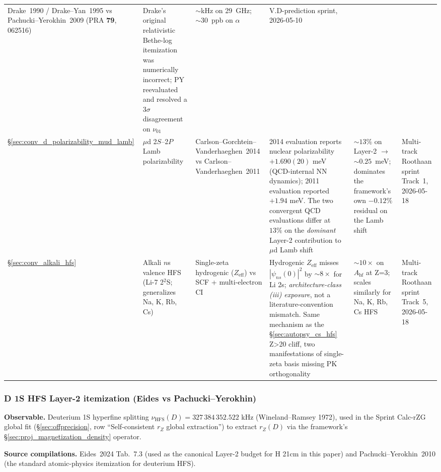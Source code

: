 \documentclass[11pt]{article}
\begin{document}
\begin{table}[h]
\begin{tabular}{p{0.6cm} p{2.6cm} p{3.0cm} p{2.6cm} p{1.6cm} p{1.6cm}}
Drake~1990 / Drake--Yan~1995 vs Pachucki--Yerokhin~2009 (PRA \textbf{79}, 062516) &
Drake's original relativistic Bethe-log itemization was numerically incorrect; PY reevaluated and resolved a 3$\sigma$ disagreement on $\nu_{01}$ &
$\sim$kHz on 29~GHz; $\sim 30$~ppb on $\alpha$ &
V.D-prediction sprint, 2026-05-10 \\
\S\ref{sec:conv_d_polarizability_mud_lamb} &
$\mu$d 2$S$--2$P$ Lamb polarizability &
Carlson--Gorchtein--Vanderhaeghen~2014 vs Carlson--Vanderhaeghen~2011 &
2014 evaluation reports nuclear polarizability $+1.690(20)$ meV
(QCD-internal NN dynamics);
2011 evaluation reported $+1.94$ meV.
The two convergent QCD evaluations differ at ~$13\%$ on the
\emph{dominant} Layer-2 contribution to $\mu$d Lamb shift &
$\sim 13\%$ on Layer-2 $\to$ $\sim 0.25$~meV; dominates the
framework's own $-0.12\%$ residual on the Lamb shift &
Multi-track Roothaan sprint Track~1, 2026-05-18 \\
\S\ref{sec:conv_alkali_hfs} &
Alkali $n$s valence HFS (Li-7 2$^2$S; generalizes Na, K, Rb, Cs) &
Single-zeta hydrogenic ($Z_\text{eff}$) vs SCF + multi-electron CI &
Hydrogenic $Z_\text{eff}$ misses $|\psi_{ns}(0)|^2$ by $\sim 8\times$
for Li 2s; \emph{architecture-class (iii) exposure}, not a
literature-convention mismatch.  Same mechanism as the
\S\ref{sec:autopsy_cs_hfs} Z\textgreater 20 cliff, two manifestations
of single-zeta basis missing PK orthogonality &
$\sim 10\times$ on $A_\text{hf}$ at Z=3; scales similarly for Na,
K, Rb, Cs HFS &
Multi-track Roothaan sprint Track~5, 2026-05-18 \\
\bottomrule
\end{tabular}
\end{table}

\subsubsection{D 1S HFS Layer-2 itemization (Eides vs Pachucki--Yerokhin)}
\label{sec:conv_rZG_DHFS}

\textbf{Observable.}  Deuterium 1S hyperfine splitting
$\nu_\text{HFS}(D) = 327\,384\,352.522$ kHz (Wineland--Ramsey 1972),
used in the Sprint Calc-rZG global fit (\S\ref{sec:offprecision}, row
``Self-consistent $r_Z$ global extraction'') to extract
$r_Z(D)$ via the framework's \S\ref{sec:proj_magnetization_density}
operator.

\textbf{Source compilations.}  Eides~2024 Tab.~7.3 (used as the
canonical Layer-2 budget for H 21cm in this paper) and
Pachucki--Yerokhin~2010 (the standard atomic-physics itemization for
deuterium HFS).
\end{document}
